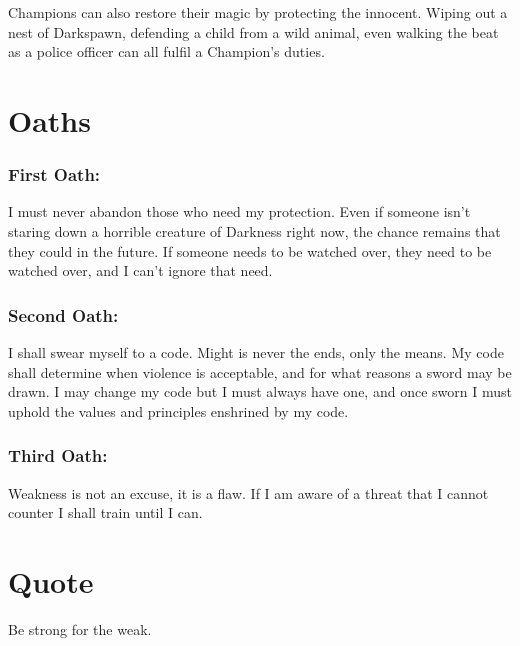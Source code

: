 Champions can also restore their magic by protecting the innocent. Wiping out a nest of Darkspawn, defending a child from a wild animal, even walking the beat as a police officer can all fulfil a Champion's duties. 

\section*{Oaths}
\subsubsection*{First Oath:} I must never abandon those who need my protection. Even if someone isn't staring down a horrible creature of Darkness right now, the chance remains that they could in the future. If someone needs to be watched over, they need to be watched over, and I can't ignore that need.

\subsubsection*{Second Oath:} I shall swear myself to a code. Might is never the ends, only the means. My code shall determine when violence is acceptable, and for what reasons a sword may be drawn. I may change my code but I must always have one, and once sworn I must uphold the values and principles enshrined by my code. 

\subsubsection*{Third Oath:} Weakness is not an excuse, it is a flaw. If I am aware of a threat that I cannot counter I shall train until I can.

\section*{Quote}

Be strong for the weak.

